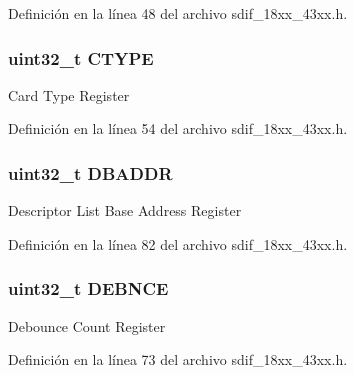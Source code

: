 Definición en la línea 48 del archivo sdif\+\_\+18xx\+\_\+43xx.\+h.

\subsubsection[{\texorpdfstring{C\+T\+Y\+PE}{CTYPE}}]{ uint32\+\_\+t C\+T\+Y\+PE}\hypertarget{struct_l_p_c___s_d_m_m_c___t_a55514debfb2b8e5a15b9c0b25820b0a6}{}\label{struct_l_p_c___s_d_m_m_c___t_a55514debfb2b8e5a15b9c0b25820b0a6}
Card Type Register 

Definición en la línea 54 del archivo sdif\+\_\+18xx\+\_\+43xx.\+h.

\subsubsection[{\texorpdfstring{D\+B\+A\+D\+DR}{DBADDR}}]{ uint32\+\_\+t D\+B\+A\+D\+DR}\hypertarget{struct_l_p_c___s_d_m_m_c___t_a5cbf91e6f1065dad3d9bde411008bb9b}{}\label{struct_l_p_c___s_d_m_m_c___t_a5cbf91e6f1065dad3d9bde411008bb9b}
Descriptor List Base Address Register 

Definición en la línea 82 del archivo sdif\+\_\+18xx\+\_\+43xx.\+h.

\subsubsection[{\texorpdfstring{D\+E\+B\+N\+CE}{DEBNCE}}]{ uint32\+\_\+t D\+E\+B\+N\+CE}\hypertarget{struct_l_p_c___s_d_m_m_c___t_af22cc0a33e41526d092554f592df5779}{}\label{struct_l_p_c___s_d_m_m_c___t_af22cc0a33e41526d092554f592df5779}
Debounce Count Register 

Definición en la línea 73 del archivo sdif\+\_\+18xx\+\_\+43xx.\+h.

